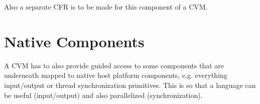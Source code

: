 Also a separate CFR is to be made for this component of a CVM. 





\section{Native Components} %

A CVM has to also provide guided access to some components that are underneath mapped to native host platform components, e.g. everything input/output or thread synchronization primitives. This is so that a language can be useful (input/output) and also parallelized (synchronization). 





